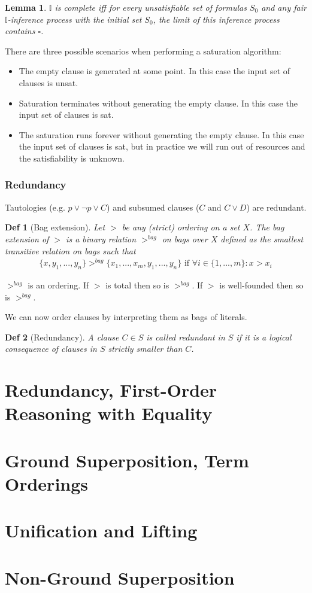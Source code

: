 \documentclass[]{article}
\newtheorem{lemma}{Lemma}
\newtheorem*{definition*}{Def}
\begin{document}
\begin{lemma}
	$\mathbb{I}$ is complete iff for every unsatisfiable set of formulas $S_0$ and any fair $\mathbb{I}$-inference process with the initial set $S_0$, the limit of this inference process contains $\square$.
\end{lemma}

There are three possible scenarios when performing a saturation algorithm:
\begin{itemize}
	\item The empty clause is generated at some point. In this case the input set of clauses is unsat.
	\item Saturation terminates without generating the empty clause. In this case the input set of clauses is sat.
	\item The saturation runs forever without generating the empty clause. In this case the input set of clauses is sat, but in practice we will run out of resources and the satisfiability is unknown.
\end{itemize}

\subsubsection{Redundancy}

Tautologies (e.g. $p \lor \lnot p \lor C$) and subsumed clauses ($C$ and $C \lor D$) are redundant.

\begin{definition*}[Bag extension]
	Let $>$ be any (strict) ordering on a set $X$. The bag extension of $>$ is a binary relation $>^{bag}$ on bags over $X$ defined as the smallest transitive relation on bags such that
	\begin{align*}
		\{x,y_1,...,y_n\} >^{bag} \{x_1,...,x_m,y_1,...,y_n\} \text{ if } \forall i\in\{1,...,m\}: x>x_i
	\end{align*}
\end{definition*}

$>^{bag}$ is an ordering. If $>$ is total then so is $>^{bag}$. If $>$ is well-founded then so is $>^{bag}$.

We can now order clauses by interpreting them as bags of literals.

\begin{definition*}[Redundancy]
	A clause $C \in S$ is called redundant in $S$ if it is a logical consequence of clauses in $S$ strictly smaller than $C$.
\end{definition*}

\section{Redundancy, First-Order Reasoning with Equality}

\section{Ground Superposition, Term Orderings}

\section{Unification and Lifting}

\section{Non-Ground Superposition}
\end{document}
